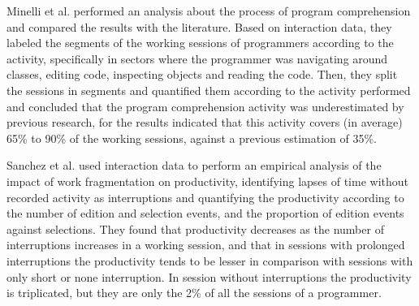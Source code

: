 Minelli et al. \cite{MMLK14} performed an analysis about the process of program comprehension and compared the results with the literature. Based on interaction data, they labeled the segments of the working sessions of programmers according to the activity, specifically in sectors where the programmer was navigating around classes, editing code, inspecting objects and reading the code. Then, they split the sessions in segments and quantified them according to the activity performed and concluded that the program comprehension activity was underestimated by previous research, for the results indicated that this activity covers (in average) 65\% to 90\% of the working sessions, against a previous estimation of 35\%.

Sanchez et al. \cite{SRV15} used interaction data to perform an empirical analysis of the impact of work fragmentation on productivity, identifying lapses of time without recorded activity as interruptions and quantifying the productivity according to the number of edition and selection events, and the proportion of edition events against selections. They found that productivity decreases as the number of interruptions increases in a working session, and that in sessions with prolonged interruptions the productivity tends to be lesser in comparison with sessions with only short or none interruption. In session without interruptions the productivity is triplicated, but they are only the 2\% of all the sessions of a programmer.
